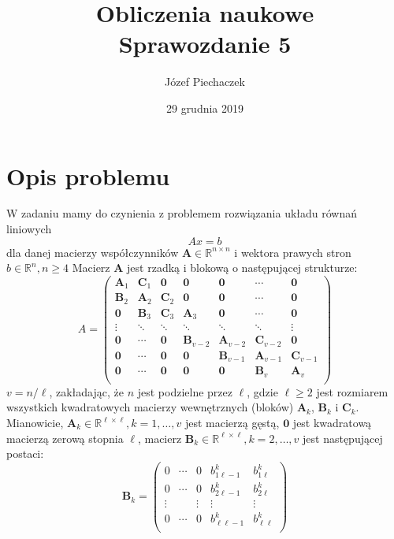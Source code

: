 \documentclass[12pt]{article}
\title{
	Obliczenia naukowe \\
	Sprawozdanie 5
}
\date{29 grudnia 2019}
\author{Józef Piechaczek}
\begin{document}
\maketitle
\newpage
{}

\setlength{\abovedisplayskip}{5pt}
\setlength{\belowdisplayskip}{5pt}

\section*{Opis problemu}
W zadaniu mamy do czynienia z problemem rozwiązania układu równań liniowych
\begin{equation*}
	Ax = b
\end{equation*}
dla danej macierzy współczynników $\textbf{A} \in \mathbb{R}^{n \times n}$ i wektora prawych stron $b \in \mathbb{R}^n, n \geq 4$ Macierz $\textbf{A}$ jest rzadką i blokową o następującej strukturze:
\begin{equation}
A = 
\begin{pmatrix}
\textbf{A}_1 & \textbf{C}_1 & \textbf{0} & \textbf{0} & \textbf{0} & \cdots & \textbf{0} \\
\textbf{B}_2 & \textbf{A}_2 & \textbf{C}_2 & \textbf{0} & \textbf{0} & \cdots & \textbf{0} \\
\textbf{0} & \textbf{B}_3 & \textbf{C}_3 & \textbf{A}_3 & \textbf{0} & \cdots & \textbf{0} \\
\vdots & \ddots & \ddots & \ddots & \ddots & \ddots & \vdots \\
\textbf{0} & \cdots & \textbf{0} & \textbf{B}_{v-2} & \textbf{A}_{v-2} & \textbf{C}_{v-2} & \textbf{0} \\
\textbf{0} & \cdots & \textbf{0} & \textbf{0} & \textbf{B}_{v-1} & \textbf{A}_{v-1} & \textbf{C}_{v-1} \\
\textbf{0} & \cdots & \textbf{0} & \textbf{0} & \textbf{0} & \textbf{B}_{v} & \textbf{A}_{v} \\
\end{pmatrix}
\end{equation}
$v = n/\ell$, zakładając, że $n$ jest podzielne przez $\ell$, gdzie $\ell \geq 2 $ jest rozmiarem wszystkich kwadratowych macierzy wewnętrznych (bloków) $\textbf{A}_k$, $\textbf{B}_k$ i $\textbf{C}_k$. Mianowicie, $\textbf{A}_k \in \mathbb{R}^{\ell \times \ell}, k = 1, \dots, v$ jest macierzą gęstą, $\textbf{0}$ jest kwadratową macierzą zerową stopnia $\ell$, macierz $\textbf{B}_k \in  \mathbb{R}^{\ell \times \ell}, k = 2, \dots, v$ jest następującej postaci:
\begin{equation}
\textbf{B}_k = 
\begin{pmatrix}
0 & \cdots & 0 & b^k_{1 \ell-1} & b^k_{1 \ell} \\
0 & \cdots & 0 & b^k_{2 \ell-1} & b^k_{2 \ell} \\
\vdots & & \vdots & \vdots & \vdots \\
0 & \cdots & 0 & b^k_{\ell \ell-1} & b^k_{\ell \ell} \\
\end{pmatrix}
\end{equation}
\end{document}
